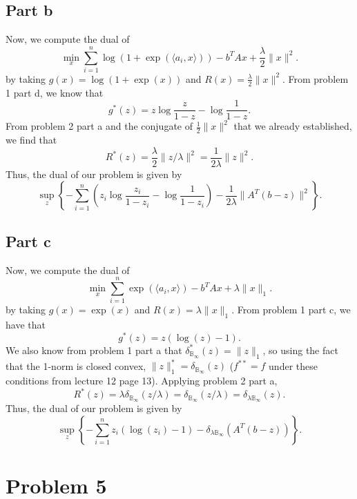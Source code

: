 \documentclass{article}
\begin{document}
\subsection{Part b}
Now, we compute the dual of 
\[
\min_x \sum_{i=1}^n \log(1+\exp(\langle a_i, x \rangle))  - b^TAx  + \frac{\lambda}{2}\|x\|^2. 
\]
by taking $g(x)=\log(1+\exp(x))$ and $R(x)=\frac{\lambda}{2}\|x\|^2$. From problem 1 part d, we know that 
\[
g^*(z)=z\log\frac{z}{1-z}-\log\frac{1}{1-z}.
\]
From problem 2 part a and the conjugate of $\frac{1}{2}\|x\|^2$ that we already established, we find that
\[
R^*(z)=\frac{\lambda}{2}\|z/\lambda\|^2=\frac{1}{2\lambda}\|z\|^2.
\]
Thus, the dual of our problem is given by
\[
\sup_z \left\{-\sum_{i=1}^n\left(z_i\log\frac{z_i}{1-z_i}-\log\frac{1}{1-z_i}\right)-\frac{1}{2\lambda}\|A^T(b-z)\|^2\right\}.
\]
\subsection{Part c}
Now, we compute the dual of 
\[
\min_x \sum_{i=1}^n \exp(\langle a_i, x \rangle) - b^TAx +  \lambda\|x\|_1. 
\]
by taking $g(x)=\exp(x)$ and $R(x)=\lambda\|x\|_1$. From problem 1 part c, we have that 
\[
g^*(z)=z(\log(z)-1).
\]
We also know from problem 1 part a that $\delta^*_{\mathbb{B}_{\infty}}(z)=\|z\|_1$, so using the fact that the 1-norm is closed convex, $\|z\|^*_1=\delta_{\mathbb{B}_{\infty}}(z)$ ($f^{**}=f$ under these conditions from lecture 12 page 13). Applying problem 2 part a,
\[
R^*(z)=\lambda\delta_{\mathbb{B}_{\infty}}(z/\lambda)=\delta_{\mathbb{B}_{\infty}}(z/\lambda)=\delta_{\lambda\mathbb{B}_{\infty}}(z).
\]
Thus, the dual of our problem is given by
\[
\sup_z \left\{-\sum_{i=1}^nz_i(\log(z_i)-1)-\delta_{\lambda\mathbb{B}_{\infty}}(A^T(b-z))\right\}.
\]

\section{Problem 5}
\end{document}
